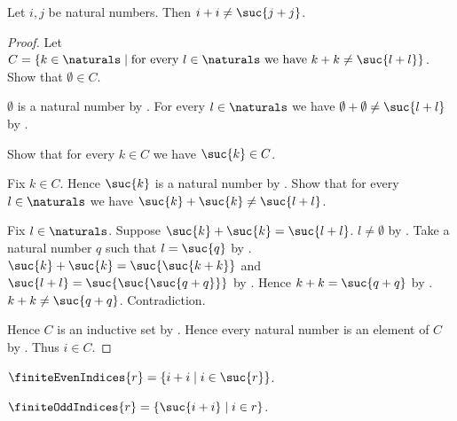 \begin{lemma}\label{natural_double_not_successor_double}
    Let $i,j$ be natural numbers.
    Then $i+i\neq\suc{j+j}$.
\end{lemma}
\begin{proof}
    Let $C=\{k\in\naturals\mid
        \text{for every $l\in\naturals$ we have
        $k+k\neq\suc{l+l}$}\}$.
    Show that $\emptyset\in C$.
    \begin{subproof}
        $\emptyset$ is a natural number by .
        For every $l\in\naturals$ we have
            $\emptyset+\emptyset\neq\suc{l+l}$
            by .
    \end{subproof}
    Show that for every $k\in C$ we have $\suc{k}\in C$.
    \begin{subproof}
        Fix $k\in C$.
        Hence $\suc{k}$ is a natural number by .
        Show that for every $l\in\naturals$ we have
            $\suc{k}+\suc{k}\neq\suc{l+l}$.
        \begin{subproof}
            Fix $l\in\naturals$.
            Suppose $\suc{k}+\suc{k}=\suc{l+l}$.
            $l\neq\emptyset$
                by .
            Take a natural number $q$ such that $l=\suc{q}$
                by .
            $\suc{k}+\suc{k}=\suc{\suc{k+k}}$ and
                $\suc{l+l}=\suc{\suc{\suc{q+q}}}$
                by .
            Hence $k+k=\suc{q+q}$ by .
            $k+k\neq\suc{q+q}$.
            Contradiction.
        \end{subproof}
    \end{subproof}
    Hence $C$ is an inductive set by .
    Hence every natural number is an element of $C$
        by .
    Thus $i\in C$.
\end{proof}

\begin{definition}\label{finite_even_indices}
    $\finiteEvenIndices{r}=\{i+i\mid i\in\suc{r}\}$.
\end{definition}

\begin{definition}\label{finite_odd_indices}
    $\finiteOddIndices{r}=\{\suc{i+i}\mid i\in r\}$.
\end{definition}

